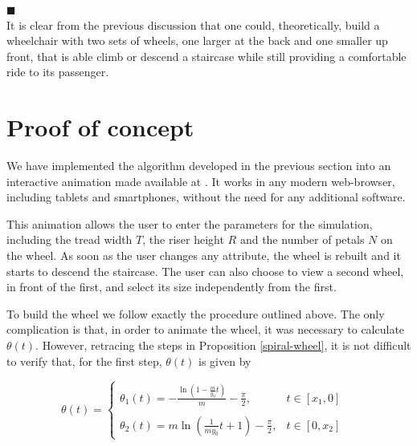 \documentclass{article}
\theoremstyle{theorem}
\theoremstyle{theorem}
\begin{document}
\hfill $\blacksquare$ \\

It is clear from the previous discussion that one could,
theoretically, build a wheelchair with two sets of wheels, one larger
at the back and one smaller up front, that is able climb or descend a
staircase while still providing a comfortable ride to its passenger.

\section{Proof of concept}

We have implemented the algorithm developed in the previous section
into an interactive animation made available at \cite{web-animation}. It works in any modern web-browser, including tablets and
smartphones, without the need for any additional software.

This animation allows the user to enter the parameters for the
simulation, including the tread width $T$, the riser height $R$ and
the number of petals $N$ on the wheel. As soon as the user changes any
attribute, the wheel is rebuilt and it starts to descend the
staircase. The user can also choose to view a second wheel, in front
of the first, and select its size independently from the first.

To build the wheel we follow exactly the procedure outlined above. The
only complication is that, in order to animate the wheel, it was
necessary to calculate $\theta(t)$. However, retracing the steps in
Proposition \ref{spiral-wheel}, it is not difficult to verify that, for
the first step, $\theta(t)$ is given by

\begin{equation}
  \theta(t)=
  \left \lbrace
    \begin{array}{ll}
      \theta_1(t)=-\frac{\ln\left(1-\frac{m}{y_0}t\right)}{m}-\frac{\pi}{2},
      & t \in \left[x_1,0\right]
      \\
\\
      \theta_2(t)=m\ln\left(\frac{1}{my_0}t+1\right)-\frac{\pi}{2},
      & t \in \left[0, x_2\right]
    \end{array}
  \right. \quad
\end{equation}
\end{document}
